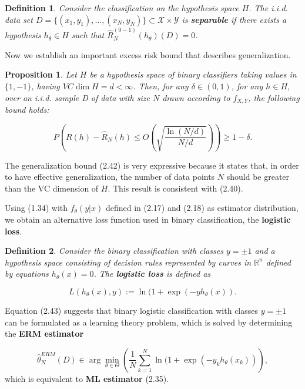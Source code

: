 \documentclass{report}
\newtheorem{definition}{Definition}[chapter]
\newtheorem{proposition}{Proposition}[chapter]
\begin{document}
\begin{definition}
Consider the classification on the hypothesis space $H$. The i.i.d. data set $D = \{(x_1,y_1), \dots, (x_N,y_N)\} \subset \mathcal{X} \times \mathcal{Y}$ is \textbf{separable} if there exists a hypothesis $h_\theta \in H$ such that $\hat{R}^{(0-1)}_N(h_\theta)(D) = 0$.
\end{definition}
Now we establish an important excess risk bound that describes generalization.

\begin{proposition}
Let $H$ be a hypothesis space of binary classifiers taking values in $\{1, -1\}$, having $VC\dim H = d < \infty$. Then, for any $\delta \in (0,1)$, for any $h \in H$, over an i.i.d. sample D of data with size $N$ drawn according to $f_{X,Y}$, the following bound holds:

\begin{equation}
P\left(R(h) - \hat{R}_N(h) \leq O\left(\sqrt{\frac{\ln(N/d)}{N/d}}\right)\right) \geq 1-\delta.
\end{equation}
\end{proposition}
The generalization bound (2.42) is very expressive because it states that, in order to have effective generalization, the number of data points $N$ should be greater than the VC dimension of $H$. This result is consistent with (2.40).

Using (1.34) with $f_\theta(y|x)$ defined in (2.17) and (2.18) as estimator distribution, we obtain an alternative loss function used in binary classification, the \textbf{logistic loss}.

\begin{definition}
Consider the binary classification with classes $y=\pm 1$ and a hypothesis space consisting of decision rules represented by curves in $\mathbb{R}^n$ defined by equations $h_\theta(x) = 0$. The \textbf{logistic loss} is defined as

\begin{equation}
L(h_\theta(x), y) := \ln(1+\exp(-yh_\theta(x)).
\end{equation}
\end{definition}
Equation (2.43) suggests that binary logistic classification with classes $y=\pm 1$ can be formulated as a learning theory problem, which is solved by determining the \textbf{ERM estimator}

\begin{equation}
\hat{\theta}_N^{ERM}(D) \in \arg \min_{\theta \in \Theta}\left(\frac{1}{N}\sum_{k=1}^N \ln(1+\exp(-y_kh_\theta(x_k))\right),
\end{equation}
which is equivalent to \textbf{ML estimator} (2.35).
\end{document}
